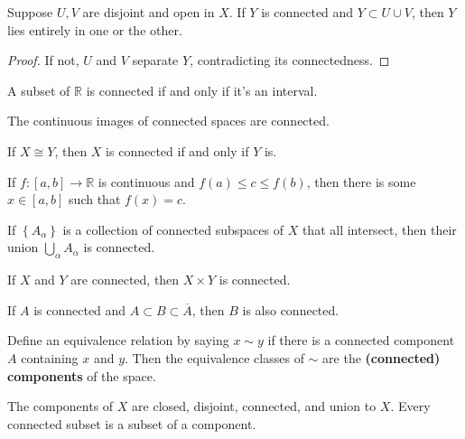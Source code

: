 \documentclass[twoside,10pt]{report}
\begin{document}
\begin{prop}
	Suppose $U,V$ are disjoint and open in $X$. If $Y$ is connected and $Y \subset U \cup V$, then $Y$ lies entirely in one or the other.
\end{prop}
\begin{proof}
	If not, $U$ and $V$ separate $Y$, contradicting its connectedness.
\end{proof}

\begin{thrm}[]
A subset of $\mathbb{R}$ is connected if and only if it's an interval.
\end{thrm}

\begin{prop}
The continuous images of connected spaces are connected.
\end{prop}

\begin{cor}
	If $X \cong Y$, then $X$ is connected if and only if $Y$ is.
\end{cor}

\begin{thrm}
	If $f:[a,b]\to \mathbb{R}$ is continuous and $f(a) \leq c \leq f(b)$, then there is some $x \in [a,b]$ such that $f(x)=c$.
\end{thrm}

\begin{lem}
	If $\left\{ A_{\alpha} \right\}$ is a collection of connected subspaces of $X$ that all intersect, then their union $\bigcup_{\alpha}A_{\alpha}$ is connected.
\end{lem}

\begin{prop}
If $X$ and $Y$ are connected, then $X \times Y$ is connected.
\end{prop}

\begin{prop}
If $A$ is connected and $A \subset B \subset \overline{A}$, then $B$ is also connected.
\end{prop}

\begin{defn}[]
	Define an equivalence relation by saying $x \sim y$ if there is a connected component $A$ containing $x$ and $y$. Then the equivalence classes of $\sim$ are the \textbf{(connected) components} of the space.
\end{defn}

\begin{thrm}[]
The components of $X$ are closed, disjoint, connected, and union to $X$. Every connected subset is a subset of a component.
\end{thrm}
\end{document}
